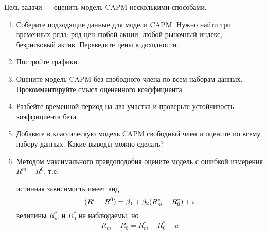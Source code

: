 \begin{problem}
Цель задачи — оценить модель CAPM несколькими способами.
\begin{enumerate}
\item Соберите подходящие данные для модели CAPM. Нужно найти три временных ряда: ряд цен любой акции, любой рыночный индекс, безрисковый актив. Переведите цены в доходности.
\item Постройте графики.
\item Оцените модель CAPM без свободного члена по всем наборам данных. Прокомментируйте смысл оцененного коэффициента.
\item Разбейте временной период на два участка и проверьте устойчивость коэффициента бета.
\item Добавьте в классическую модель CAPM свободный член и оцените по всему набору данных. Какие выводы можно сделать?
\item Методом максимального правдоподобия оцените модель с ошибкой измерения $R^m-R^0$, т.е.

истинная зависимость имеет вид
\begin{equation*}
(R^s-R^0)=\beta_1+\beta_2(R_m^*-R_0^*)+\varepsilon
\end{equation*}
величины $R_m^*$ и $R_0^*$ не наблюдаемы, но
\begin{equation*}
R_m-R_0=R_m^*-R_0^*+u
\end{equation*}

\end{enumerate}


\begin{sol}
\end{sol}
\end{problem}








